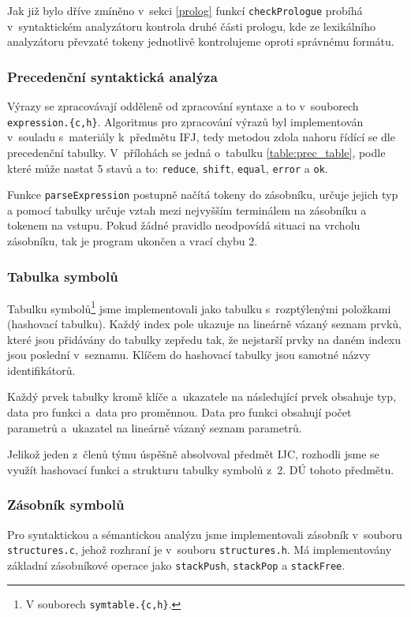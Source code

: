 \documentclass[a4paper,12pt]{article}
\begin{document}
Jak již bylo dříve zmíněno v~sekci \ref{prolog} funkcí \verb|checkPrologue| probíhá v~syntaktickém analyzátoru kontrola druhé části prologu, kde ze lexikálního analyzátoru převzaté tokeny jednotlivě kontrolujeme oproti správnému formátu.

\subsubsection{Precedenční syntaktická analýza}
Výrazy se zpracovávají odděleně od zpracování syntaxe a to v~souborech \verb|expression.{c,h}|. Algoritmus pro zpracování výrazů byl implementován v~souladu s~materiály k~předmětu IFJ, tedy metodou zdola nahoru řídící se dle precedenční tabulky. V~přílohách se jedná o~tabulku \ref{table:prec_table}, podle které může nastat 5 stavů a to: \verb|reduce|, \verb|shift|, \verb|equal|, \verb|error| a \verb|ok|.

Funkce \verb|parseExpression| postupně načítá tokeny do zásobníku, určuje jejich typ a pomocí tabulky určuje vztah mezi nejvyšším terminálem na zásobníku a tokenem na vstupu. Pokud žádné pravidlo neodpovídá situaci na vrcholu zásobníku, tak je program ukončen a vrací chybu 2.


\subsubsection{Tabulka symbolů}
Tabulku symbolů\footnote{V souborech \verb|symtable.{c,h}|.} jsme implementovali jako tabulku s~rozptýlenými položkami (hashovací tabulku). Každý index pole ukazuje na lineárně vázaný seznam prvků, které jsou přidávány do tabulky zepředu tak, že nejstarší prvky na daném indexu jsou poslední v~seznamu. Klíčem do hashovací tabulky jsou samotné názvy identifikátorů.

Každý prvek tabulky kromě klíče a~ukazatele na následující prvek obsahuje typ, data pro funkci a~data pro proměnnou. Data pro funkci obsahují počet parametrů a~ukazatel na lineárně vázaný seznam parametrů.

Jelikož jeden z~členů týmu úspěšně absolvoval předmět IJC, rozhodli jsme se využít hashovací funkci a strukturu tabulky symbolů z~2. DÚ tohoto předmětu\cite{IJC2DU}.

\clearpage

\subsubsection{Zásobník symbolů}
Pro syntaktickou a sémantickou analýzu jsme implementovali zásobník v~souboru \verb|structures.c|, jehož rozhraní je v~souboru \verb|structures.h|. Má implementovány základní zásobníkové operace jako \verb|stackPush|, \verb|stackPop| a \verb|stackFree|.
\end{document}
